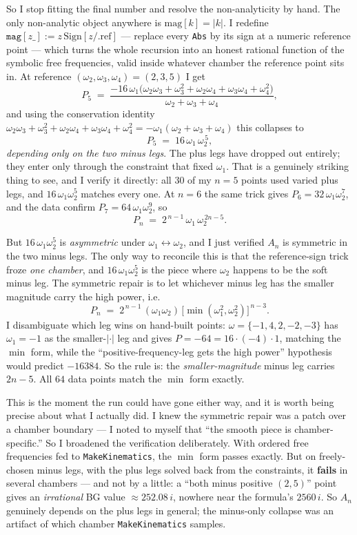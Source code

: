 \documentclass{article}
\begin{document}
So I stop fitting the final number and resolve the non-analyticity by hand. The
only non-analytic object anywhere is $\mathrm{mag}[k]=|k|$. I redefine
$\texttt{mag}[z\_]:=z\,\mathrm{Sign}[z/.\mathrm{ref}]$ --- replace every
\texttt{Abs} by its sign at a numeric reference point --- which turns the whole
recursion into an honest rational function of the symbolic free frequencies,
valid inside whatever chamber the reference point sits in. At reference
$(\omega_2,\omega_3,\omega_4)=(2,3,5)$ I get
\[
P_5 \;=\; \frac{-16\,\omega_1\big(\omega_2\omega_3+\omega_3^2+\omega_2\omega_4
+\omega_3\omega_4+\omega_4^2\big)}{\omega_2+\omega_3+\omega_4},
\]
and using the conservation identity
$\omega_2\omega_3+\omega_3^2+\omega_2\omega_4+\omega_3\omega_4+\omega_4^2
=-\omega_1(\omega_2+\omega_3+\omega_4)$ this collapses to
\[
P_5 \;=\; 16\,\omega_1\,\omega_2^{\,5},
\]
\emph{depending only on the two minus legs}. The plus legs have dropped out
entirely; they enter only through the constraint that fixed $\omega_1$. That is a
genuinely striking thing to see, and I verify it directly: all $30$ of my $n=5$
points used varied plus legs, and $16\,\omega_1\omega_2^5$ matches every one. At
$n=6$ the same trick gives $P_6=32\,\omega_1\omega_2^7$, and the data confirm
$P_7=64\,\omega_1\omega_2^9$, so
\[
P_n \;=\; 2^{\,n-1}\,\omega_1\,\omega_2^{\,2n-5}.
\]

But $16\,\omega_1\omega_2^5$ is \emph{asymmetric} under $\omega_1\leftrightarrow
\omega_2$, and I just verified $A_n$ is symmetric in the two minus legs. The only
way to reconcile this is that the reference-sign trick froze \emph{one chamber},
and $16\,\omega_1\omega_2^5$ is the piece where $\omega_2$ happens to be the soft
minus leg. The symmetric repair is to let whichever minus leg has the smaller
magnitude carry the high power, i.e.
\[
P_n \;=\; 2^{\,n-1}\,(\omega_1\omega_2)\,\big[\min(\omega_1^2,\omega_2^2)\big]^{\,n-3}.
\]
I disambiguate which leg wins on hand-built points: $\omega=\{-1,4,2,-2,-3\}$ has
$\omega_1=-1$ as the smaller-$|\cdot|$ leg and gives $P=-64=16\cdot(-4)\cdot1$,
matching the $\min$ form, while the ``positive-frequency-leg gets the high power''
hypothesis would predict $-16384$. So the rule is: the \emph{smaller-magnitude}
minus leg carries $2n-5$. All $64$ data points match the $\min$ form exactly.

This is the moment the run could have gone either way, and it is worth being
precise about what I actually did. I knew the symmetric repair was a patch over a
chamber boundary --- I noted to myself that ``the smooth piece is
chamber-specific.'' So I broadened the verification deliberately. With ordered
free frequencies fed to \texttt{MakeKinematics}, the $\min$ form passes exactly.
But on freely-chosen minus legs, with the plus legs solved back from the
constraints, it \textbf{fails} in several chambers --- and not by a little: a
``both minus positive $(2,5)$'' point gives an \emph{irrational} BG value
$\approx252.08\,i$, nowhere near the formula's $2560\,i$. So $A_n$ genuinely
depends on the plus legs in general; the minus-only collapse was an artifact of
which chamber \texttt{MakeKinematics} samples.
\end{document}
